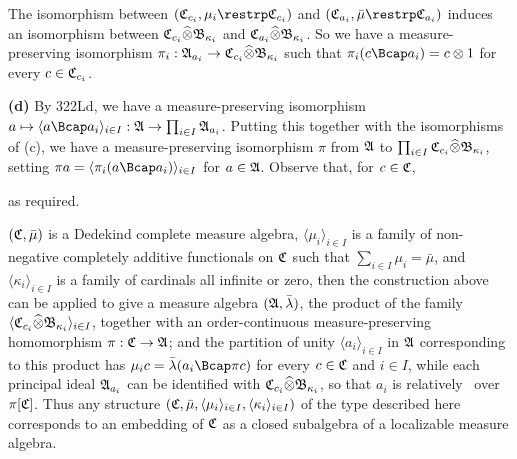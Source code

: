 {The isomorphism between $(\frak C_{c_i},\mu_i\restrp\frak C_{c_i})$ and
$(\frak C_{a_i},\bar\mu\restrp\frak C_{a_i})$ induces an isomorphism
between
$\frak C_{c_i}\widehat{\otimes}\frak B_{\kappa_i}$ and
$\frak C_{a_i}\widehat{\otimes}\frak B_{\kappa_i}$.   So we have a
measure-preserving isomorphism
$\pi_i:\frak A_{a_i}\to\frak C_{c_i}\widehat{\otimes}\frak B_{\kappa_i}$
such that $\pi_i(c\Bcap a_i)=c\otimes 1$ for every $c\in\frak C_{c_i}$.

\medskip

{\bf (d)} By 322Ld, we have a measure-preserving isomorphism
$a\mapsto\langle a\Bcap a_i\rangle_{i\in I}:
\frak A\to\prod_{i\in I}\frak A_{a_i}$.
Putting this together with the isomorphisms of (c), we have a
measure-preserving isomorphism $\pi$ from $\frak A$ to
$\prod_{i\in I}\frak C_{c_i}\widehat{\otimes}\frak B_{\kappa_i}$,
setting $\pi a=\langle\pi_i(a\Bcap a_i)\rangle_{i\in I}$ for
$a\in\frak A$.   Observe that, for $c\in\frak C$,


\noindent as required.
}%


 $(\frak C,\bar\mu)$ is a Dedekind complete measure
algebra, $\langle\mu_i\rangle_{i\in I}$ is a family of non-negative
completely additive functionals on $\frak C$ such that
$\sum_{i\in I}\mu_i=\bar\mu$, and $\langle\kappa_i\rangle_{i\in I}$ is a
family of
cardinals all infinite or zero, then the construction above can be
applied to give a measure algebra $(\frak A,\bar\lambda)$, the product
of the family
$\langle\frak C_{c_i}\widehat{\otimes}\frak B_{\kappa_i}\rangle_{i\in I}$,
together with an order-continuous
measure-preserving
homomorphism $\pi:\frak C\to\frak A$;  and the partition
of unity
$\langle a_i\rangle_{i\in I}$ in $\frak A$ corresponding to this
product has $\mu_ic=\bar\lambda(a_i\Bcap\pi c)$ for
every $c\in\frak C$ and $i\in I$, while each principal ideal
$\frak A_{a_i}$ can be
identified with $\frak C_{c_i}\widehat{\otimes}\frak B_{\kappa_i}$, so
that $a_i$ is relatively \Mth\ over $\pi[\frak C]$.   Thus
any structure $(\frak C,\bar\mu,\langle\mu_i\rangle_{i\in
I},\langle\kappa_i\rangle_{i\in I})$ of the type described here
corresponds to an embedding of $\frak C$ as a closed subalgebra of
a localizable measure algebra.


